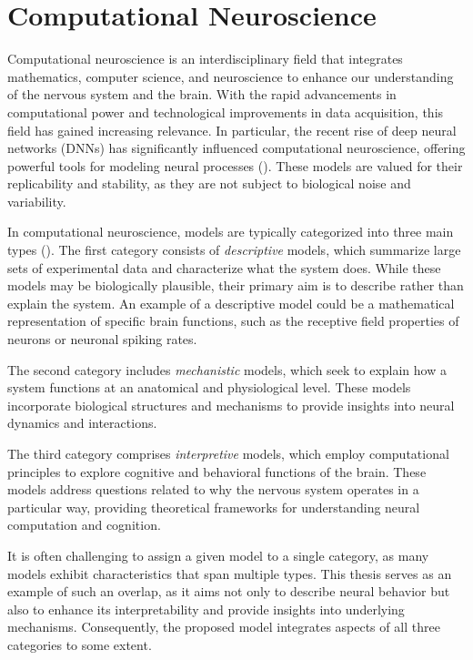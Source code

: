 \chapter{Computational Neuroscience}
\label{chap:computation_neuroscience}

Computational neuroscience is an interdisciplinary field that integrates mathematics, computer science, and neuroscience to enhance our understanding of the nervous system and the brain. With the rapid advancements in computational power and technological improvements in data acquisition, this field has gained increasing relevance. In particular, the recent rise of deep neural networks (DNNs) has significantly influenced computational neuroscience, offering powerful tools for modeling neural processes (\citet{Kietzmann133504}). These models are valued for their replicability and stability, as they are not subject to biological noise and variability.

In computational neuroscience, models are typically categorized into three main types (\citet{dayan2005theoretical}). The first category consists of \emph{descriptive} models, which summarize large sets of experimental data and characterize what the system does. While these models may be biologically plausible, their primary aim is to describe rather than explain the system. An example of a descriptive model could be a mathematical representation of specific brain functions, such as the receptive field properties of neurons or neuronal spiking rates.

The second category includes \emph{mechanistic} models, which seek to explain how a system functions at an anatomical and physiological level. These models incorporate biological structures and mechanisms to provide insights into neural dynamics and interactions.

The third category comprises \emph{interpretive} models, which employ computational principles to explore cognitive and behavioral functions of the brain. These models address questions related to why the nervous system operates in a particular way, providing theoretical frameworks for understanding neural computation and cognition.

It is often challenging to assign a given model to a single category, as many models exhibit characteristics that span multiple types. This thesis serves as an example of such an overlap, as it aims not only to describe neural behavior but also to enhance its interpretability and provide insights into underlying mechanisms. Consequently, the proposed model integrates aspects of all three categories to some extent.

